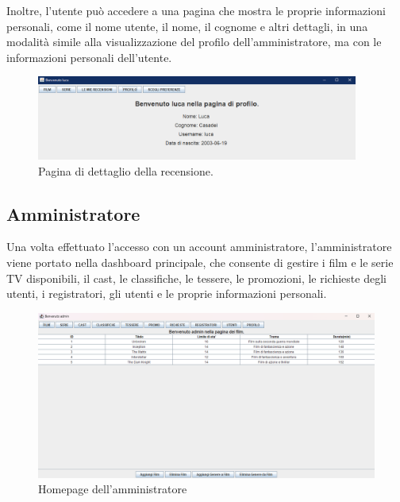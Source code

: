 \documentclass[a4paper,12pt]{report}
\begin{document}
Inoltre, l'utente può accedere a una pagina che mostra le proprie informazioni personali, come il nome utente, il nome, il cognome e altri dettagli, in una modalità simile alla visualizzazione del profilo dell'amministratore, ma con le informazioni personali dell'utente.
\begin{figure}[H]
	\centering
	\includegraphics[width=300pt]{appimg/userprofilepage.png}
	\caption{Pagina di dettaglio della recensione.}
\end{figure}
\subsection{Amministratore}
Una volta effettuato l'accesso con un account amministratore, l'amministratore viene portato nella dashboard principale, che consente di gestire i film e le serie TV disponibili, il cast, le classifiche, le tessere, le promozioni, le richieste degli utenti, i registratori, gli utenti e le proprie informazioni personali. \\
\begin{figure}[H]
	\centering
	\includegraphics[width=375pt]{appimg/adminImages/homepage.png}
	\caption{Homepage dell'amministratore}
\end{figure}
\end{document}

